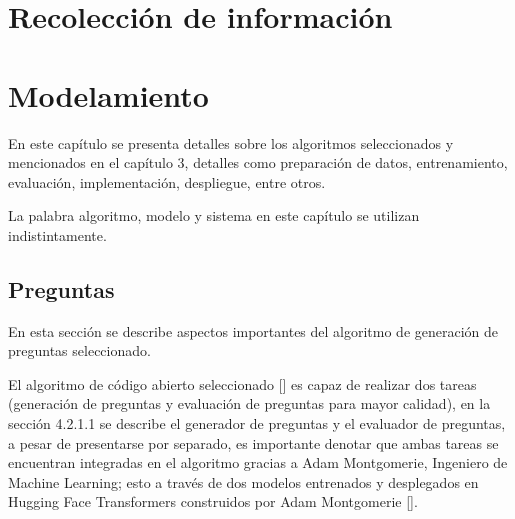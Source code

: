 \documentclass[spanish, a4paper, 12pt, twoside, openany]{book}
\numberwithin{equation}{section} %
\begin{document}






\chapter{Recolección de información}
\minitoc%

\clearpage

\chapter{Modelamiento}
\minitoc%
\begin{justify}
En este capítulo se presenta detalles sobre los algoritmos seleccionados y mencionados en el capítulo 3, detalles como preparación de datos, entrenamiento, evaluación, implementación, despliegue, entre otros.

La palabra algoritmo, modelo y sistema en este capítulo se utilizan indistintamente.
\end{justify}



\section{Preguntas}
\begin{justify}
En esta sección se describe aspectos importantes del algoritmo de generación de preguntas seleccionado. 

El algoritmo de código abierto seleccionado [] es capaz de realizar dos tareas (generación de preguntas y evaluación de preguntas para mayor calidad), en la sección 4.2.1.1 se describe el generador de preguntas y el evaluador de preguntas, a pesar de presentarse por separado, es importante denotar que ambas tareas se encuentran integradas en el algoritmo gracias a Adam Montgomerie, Ingeniero de Machine Learning; esto a través de dos modelos entrenados y desplegados en Hugging Face Transformers construidos por Adam Montgomerie [].
\end{justify}
\end{document}
